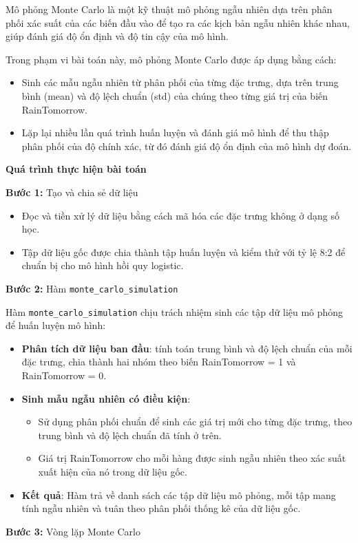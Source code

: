 \documentclass[conference]{IEEEtran}
\begin{document}
Mô phỏng Monte Carlo là một kỹ thuật mô phỏng ngẫu nhiên dựa trên phân phối xác suất của các biến đầu vào để tạo ra các kịch bản ngẫu nhiên khác nhau, giúp đánh giá độ ổn định và độ tin cậy của mô hình.

Trong phạm vi bài toán này, mô phỏng Monte Carlo được áp dụng bằng cách:
\begin{itemize}
    \item Sinh các mẫu ngẫu nhiên từ phân phối của từng đặc trưng, dựa trên trung bình (mean) và độ lệch chuẩn (std) của chúng theo từng giá trị của biến RainTomorrow.
    \item Lặp lại nhiều lần quá trình huấn luyện và đánh giá mô hình để thu thập phân phối của độ chính xác, từ đó đánh giá độ ổn định của mô hình dự đoán.
\end{itemize}

\noindent \textbf {Quá trình thực hiện bài toán}

\noindent \textbf{Bước 1:} Tạo và chia sẻ dữ liệu

\begin{itemize}
    \item Đọc và tiền xử lý dữ liệu bằng cách mã hóa các đặc trưng không ở dạng số học.
    \item Tập dữ liệu gốc được chia thành tập huấn luyện và kiểm thử với tỷ lệ 8:2 để chuẩn bị cho mô hình hồi quy logistic.
\end{itemize}

\noindent \textbf{Bước 2:} Hàm \texttt{monte\_carlo\_simulation}

\noindent Hàm \texttt{monte\_carlo\_simulation} chịu trách nhiệm sinh các tập dữ liệu mô phỏng để huấn luyện mô hình:

\begin{itemize}
    \item \textbf{Phân tích dữ liệu ban đầu}: tính toán trung bình và độ lệch chuẩn của mỗi đặc trưng, chia thành hai nhóm theo biến RainTomorrow = 1 và RainTomorrow = 0.
    \item \textbf{Sinh mẫu ngẫu nhiên có điều kiện}:
    \begin{itemize}
        \item Sử dụng phân phối chuẩn để sinh các giá trị mới cho từng đặc trưng, theo trung bình và độ lệch chuẩn đã tính ở trên.
        \item Giá trị RainTomorrow cho mỗi hàng được sinh ngẫu nhiên theo xác suất xuất hiện của nó trong dữ liệu gốc.
    \end{itemize}
    \item \textbf{Kết quả}: Hàm trả về danh sách các tập dữ liệu mô phỏng, mỗi tập mang tính ngẫu nhiên và tuân theo phân phối thống kê của dữ liệu gốc.
\end{itemize}
\textbf {Bước 3:} Vòng lặp Monte Carlo
\end{document}
